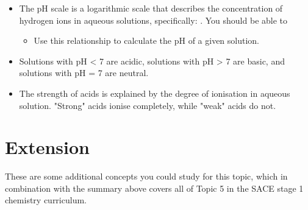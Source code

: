 \documentclass{article}
\begin{document}
\begin{itemize}
  \item The pH scale is a logarithmic scale that
describes the concentration of hydrogen
ions in aqueous solutions, specifically: . You should be able to 
    \begin{itemize}
      \item Use this relationship to calculate the pH of a given solution.
    \end{itemize}
  
  \item Solutions with pH < 7 are acidic, solutions
with pH > 7 are basic, and solutions with
pH = 7 are neutral.

  \item The strength of acids is explained by the
degree of ionisation in aqueous solution. "Strong" acids ionise completely, while "weak" acids do not. 
  
\end{itemize}

% 


\pagebreak
\section*{Extension}

These are some additional concepts you could study for this topic, which in combination with the summary above covers all of Topic 5 in the SACE stage 1 chemistry curriculum. 
\end{document}
